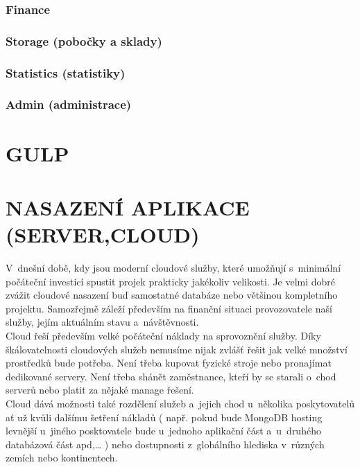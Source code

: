 \documentclass[a4paper,12pt,twoside,BCOR=10mm]{article}
\newcommand{\upc}[1]{\uppercase{#1}} %
\begin{document}
\subsubsection{Finance}\label{sec:finance}
\subsubsection{Storage (pobočky a sklady)}\label{sec:storage}
\subsubsection{Statistics (statistiky)}\label{sec:stats}
\subsubsection{Admin (administrace)}\label{sec:admin}


\section{\upc{Gulp}}

\section{\upc{Nasazení aplikace (server,cloud)}}
V~dnešní době, kdy jsou moderní cloudové služby, které umožňují s~minimální počáteční investicí spustit projek prakticky jakékoliv velikosti. Je velmi dobré zvážit cloudové nasazení buď samostatné databáze nebo většinou kompletního projektu. Samozřejmě záleží především na finanční situaci provozovatele naší služby, jejím aktuálním stavu a~návštěvnosti.\\

Cloud řeší především velké počáteční náklady na sprovoznění služby. Díky škálovatelnosti cloudových služeb nemusíme nijak zvlášť řešit jak velké množství prostředků bude potřeba. Není třeba kupovat fyzické stroje nebo pronajímat dedikované servery. Není třeba shánět zaměstnance, kteří by se starali o~chod serverů nebo platit za nějaké manage řešení.\\

Cloud dává možnosti také rozdělení služeb a~jejich chod u~několika poskytovatelů ať už kvůli dalšímu šetření nákladů ( např. pokud bude MongoDB hosting levnější u~jiného posktovatele bude u~jednoho aplikační část a~u~druhého databázová část apd,… ) nebo dostupnosti z~globálního hlediska v~různých zemích nebo kontinentech.\\
\end{document}
